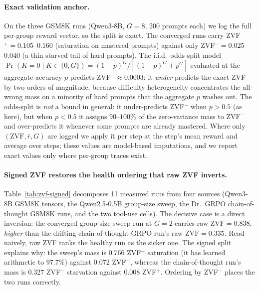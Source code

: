 \paragraph{Exact validation anchor.}
On the three GSM8K runs (Qwen3-8B, $G{=}8$, 200 prompts each) we log the
full per-group reward vector, so the split is exact. The converged runs
carry ZVF$^+{=}0.105$--$0.160$ (saturation on mastered prompts) against
only ZVF$^-{=}0.025$--$0.040$ (a thin starved tail of hard prompts). The
i.i.d.\ odds-split model $\Pr(K{=}0\mid K{\in}\{0,G\})=(1{-}p)^G/[(1{-}p)^G{+}p^G]$
evaluated at the aggregate accuracy $p$ predicts ZVF$^-{\approx}0.0003$:
it \emph{under}-predicts the exact ZVF$^-$ by two orders of magnitude,
because difficulty heterogeneity concentrates the all-wrong mass on a
minority of hard prompts that the aggregate $p$ washes out. The odds-split is
\emph{not} a bound in general: it under-predicts ZVF$^-$ when $p>0.5$ (as here),
but when $p<0.5$ it assigns $90$--$100\%$ of the zero-variance mass to
ZVF$^-$ and over-predicts it whenever some prompts are already mastered. Where
only $(\mathrm{ZVF},\bar r,G)$ are logged we apply it per step at the step's
mean reward and average over steps; these values are model-based imputations,
and we report exact values only where per-group traces exist.

\paragraph{Signed ZVF restores the health ordering that raw ZVF inverts.}
Table~\ref{tab:zvf-signed} decomposes 11 measured runs from four sources
(Qwen3-8B GSM8K tensors, the Qwen2.5-0.5B group-size sweep, the Dr.~GRPO
chain-of-thought GSM8K runs, and the two tool-use cells). The decisive case is a
direct inversion: the converged group-size-sweep run at $G{=}2$ carries raw
$\mathrm{ZVF}{=}0.838$, \emph{higher} than the drifting chain-of-thought GRPO
run's raw $\mathrm{ZVF}{=}0.335$. Read naively, raw ZVF ranks the healthy run as
the sicker one. The signed split explains why: the sweep's mass is $0.766$
ZVF$^+$ saturation (it has learned arithmetic to $97.7\%$) against $0.072$
ZVF$^-$, whereas the chain-of-thought run's mass is $0.327$ ZVF$^-$ starvation
against $0.008$ ZVF$^+$. Ordering by ZVF$^-$ places the two runs correctly.

